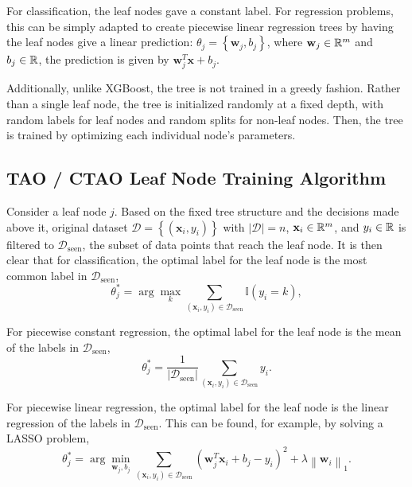\documentclass{article}
\begin{document}
For classification, the leaf nodes gave a constant label. For regression problems, this can be simply adapted to create piecewise linear regression trees by having the leaf nodes give a linear prediction: 
$\theta_j = \left\{ \mathbf{w}_j, b_j \right\}$, where $\mathbf{w}_j \in \mathbb{R}^m$ and $b_j \in \mathbb{R}$, the prediction is given by $\mathbf{w}_{j}^T\mathbf{x} + b_{j}$.

Additionally, unlike XGBoost, the tree is not trained in a greedy fashion. Rather than a single leaf node, the tree is initialized randomly at a fixed depth, with random labels for leaf nodes and random splits for non-leaf nodes.
Then, the tree is trained by optimizing each individual node's parameters.

\subsection{TAO / CTAO Leaf Node Training Algorithm}

Consider a leaf node $j$. Based on the fixed tree structure and the decisions made above it, original dataset $\mathcal{D} = \left\{ (\mathbf{x}_i, y_i) \right\}$ with $|\mathcal{D}| = n$, $\mathbf{x}_i \in \mathbb{R}^m$, and $y_i \in \mathbb{R}$
is filtered to $\mathcal{D}_\text{seen}$, the subset of data points that reach the leaf node. It is then clear that for classification, the optimal label for the leaf node is the most common label in $\mathcal{D}_\text{seen}$,
\begin{equation*}
  \theta_j^* = \arg\max_{k} \sum_{(\mathbf{x}_i, y_i) \in \mathcal{D}_\text{seen}} \mathbb{I}(y_i = k),
\end{equation*}

For piecewise constant regression, the optimal label for the leaf node is the mean of the labels in $\mathcal{D}_\text{seen}$,
\begin{equation*}
  \theta_j^* = \frac{1}{|\mathcal{D}_\text{seen}|} \sum_{(\mathbf{x}_i, y_i) \in \mathcal{D}_\text{seen}} y_i.
\end{equation*}

For piecewise linear regression, the optimal label for the leaf node is the linear regression of the labels in $\mathcal{D}_\text{seen}$. This can be
found, for example, by solving a LASSO problem,
\begin{equation*}
  \theta_j^* = \arg\min_{\mathbf{w}_j, b_j} \sum_{(\mathbf{x}_i, y_i) \in \mathcal{D}_\text{seen}} \left( \mathbf{w}_j^T\mathbf{x}_i + b_j - y_i \right)^2 + \lambda \left\| \mathbf{w}_i \right\|_1.
\end{equation*}
\end{document}

